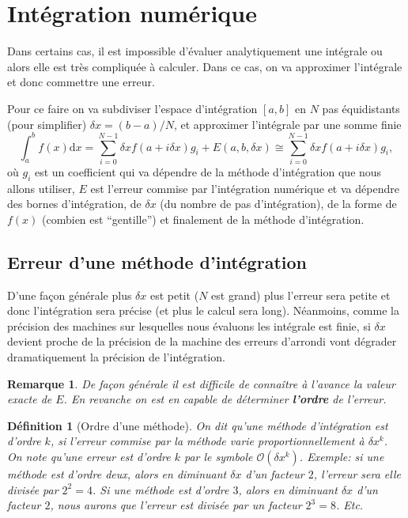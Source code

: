 \documentclass[a4paper,12pt]{book}
\newcommand{\dd}{\mathrm{d}}
\newtheorem{definition}{Définition}
\newtheorem*{remarque}{Remarque}
\begin{document}
\section{Intégration numérique}

Dans certains cas, il est impossible d'évaluer analytiquement une intégrale ou alors elle est très compliquée à calculer.
Dans ce cas, on va approximer l'intégrale et donc commettre une erreur.

Pour ce faire on va subdiviser l'espace d'intégration $[a,b]$ en $N$ pas équidistants (pour simplifier) $\delta x=(b-a)/N$,
et approximer l'intégrale par une somme finie
\begin{equation}
 \int_a^bf(x)\dd x=\sum_{i=0}^{N-1} \delta x f(a+i\delta x) g_i+E(a,b,\delta x)\cong\sum_{i=0}^{N-1} \delta x f(a+i\delta x) g_i,
\end{equation}
où $g_i$ est un coefficient qui va dépendre de la méthode d'intégration 
que nous allons utiliser, $E$ est l'erreur commise par l'intégration numérique et va dépendre des bornes d'intégration, 
de $\delta x$ (du nombre de pas d'intégration), de la forme de $f(x)$ (combien est ``gentille'') et finalement de
la méthode d'intégration.

\subsection{Erreur d'une méthode d'intégration}

D'une façon générale plus $\delta x$ est petit ($N$ est grand) plus l'erreur sera petite et donc l'intégration sera précise
(et plus le calcul sera long).
Néanmoins, comme la précision des machines sur lesquelles nous évaluons les intégrale est finie, si $\delta x$ devient 
proche de la précision de la machine des erreurs d'arrondi vont dégrader dramatiquement la précision de l'intégration.

\begin{remarque}
De façon générale il est difficile de connaître à l'avance la valeur exacte de $E$. En revanche on est
en capable de déterminer \textbf{l'ordre} de l'erreur.
\end{remarque}

\begin{definition}[Ordre d'une méthode]
 On dit qu'une méthode d'intégration est d'ordre $k$, si l'erreur commise par la méthode varie 
 proportionnellement à $\delta x^k$. On note qu'une erreur est d'ordre $k$ par le symbole $\mathcal{O}(\delta x^k)$. Exemple: si une méthode est d'ordre deux, alors en diminuant 
 $\delta x$ d'un facteur $2$, l'erreur sera elle divisée par $2^2=4$. Si une méthode est d'ordre $3$, alors en diminuant 
 $\delta x$ d'un facteur $2$, nous aurons que l'erreur est divisée par un facteur $2^3=8$. Etc.
\end{definition}
\end{document}
